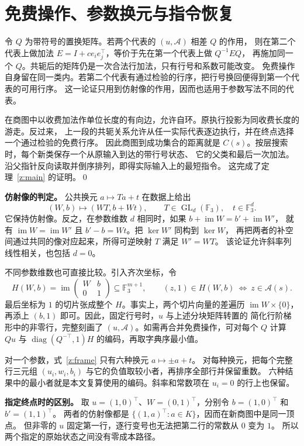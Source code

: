 \documentclass[UTF8,a4paper,11pt,scheme=plain]{ctexart}
\theoremstyle{zh}
\theoremstyle{plain}
\newcommand{\F}{\mathbb F_3}
\newcommand{\A}{\mathcal A}
\newcommand{\im}{\operatorname{im}}
\newcommand{\GL}{\operatorname{GL}}
\newcommand{\frameeq}{(W,b)\longmapsto(WT,b+Wt),\qquad T\in\GL_d(\F),\quad t\in\F^d.}
\newcommand{\homoeq}{H(W,b)=\im\begin{pmatrix}W&b\\0&1\end{pmatrix}\subseteq \F^{m+1},
       \qquad (z,1)\in H(W,b)\ \Longleftrightarrow\ z\in\A(s).}
\begin{document}
\newpage
\section{免费操作、参数换元与指令恢复}
令 $Q$ 为带符号的置换矩阵。若两个代表的 $(u,\A)$ 相差 $Q$ 的作用，
则在第二个代表上做加法 $E=I+ce_i e_j^\top$，等价于先在第一个代表上做 $Q^{-1}EQ$，
再施加同一个 $Q$。共轭后的矩阵仍是一次合法行加法，只有行号和系数可能改变。
免费操作自身留在同一类内。若第二个代表有通过检验的行序，把行号换回便得到第一个代表的可用行序。
这一论证只用到仿射像的作用，因而也适用于参数写法不同的代表。

在商图中以收费加法作单位长度的有向边，允许自环。原执行投影为同收费长度的游走。反过来，
上一段的共轭关系允许从任一实际代表逐边执行，并在终点选择一个通过检验的免费行序。
因此商图到成功集合的距离就是 $C(s)$。按层搜索时，每个新类保存一个从原输入到达的带行号状态、
它的父类和最后一次加法。沿父指针反向读取并倒序排列，即得实际输入上的最短指令。
这完成了定理~\ref{z:main} 的证明。\qed

\medskip\noindent\textbf{仿射像的判定。}
公共换元 $a\mapsto Ta+t$ 在数据上给出
\begin{equation}\label{z:frame}\frameeq\end{equation}
它保持仿射像。反之，在参数维数 $d$ 相同时，如果 $b+\im W=b'+\im W'$，
就有 $\im W=\im W'$ 且 $b'-b=Wt$。把 $\ker W'$ 同构到 $\ker W$，
再把两者的补空间通过共同的像对应起来，所得可逆映射 $T$ 满足 $W'=WT$。
该论证允许斜率列线性相关，也包括 $d=0$。

不同参数维数也可直接比较。引入齐次坐标，令
\begin{equation}\label{z:hom}\homoeq\end{equation}
最后坐标为 $1$ 的切片张成整个 $H$。事实上，两个切片向量的差遍历
$\im W\times\{0\}$，再添上 $(b,1)$ 即可。因此，固定行号时，$u$ 与上述分块矩阵转置的
简化行阶梯形中的非零行，完整刻画了 $(u,\A)$。如需再合并免费操作，可对每个 $Q$
计算 $Qu$ 与 $\operatorname{diag}(Q^{-\top},1)H$ 的编码，再取字典序最小值。

对一个参数，式~\eqref{z:frame} 只有六种换元 $a\mapsto\pm a+t$。
对每种换元，把每个完整行三元组 $(u_i,w_i,b_i)$ 与它的负值取较小者，再排序全部行并保留重数。
六种结果中的最小者就是本文复算使用的编码。斜率和常数项在 $u_i=0$ 的行上也保留。

\medskip\noindent\textbf{指定终点时的区别。}
取 $u=(1,0)^\top$、$W=(0,1)^\top$，分别令 $b=(1,0)^\top$ 和 $b'=(1,1)^\top$。
两者的仿射像都是 $\{(1,a)^\top:a\in K\}$，因而在新商图中是同一顶点。
但非零的 $u$ 固定第一行，逐行变号也无法把第二行的常数从 $0$ 变为 $1$。
所以两个指定的原始状态之间没有零成本路径。
\end{document}
